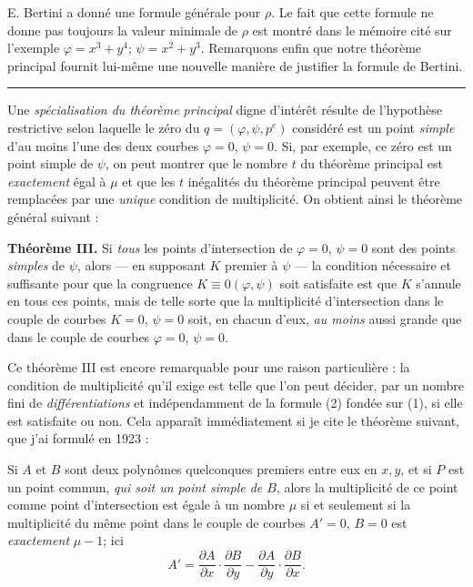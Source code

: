 E. Bertini a donné une formule générale pour $\rho$. Le fait que cette formule ne donne pas toujours la valeur minimale de $\rho$ est montré dans le mémoire cité sur l'exemple $\varphi=x^3+y^4$; $\psi=x^2+y^3$. Remarquons enfin que notre théorème principal fournit lui-même une nouvelle manière de justifier la formule de Bertini.

\begin{center}
\rule{4cm}{0.4pt}
\end{center}

Une \emph{spécialisation du théorème principal} digne d'intérêt résulte de l'hypothèse restrictive selon laquelle le zéro du $q=(\varphi,\psi,p^e)$ considéré est un point \emph{simple} d'au moins l'une des deux courbes $\varphi=0$, $\psi=0$. Si, par exemple, ce zéro est un point simple de $\psi$, on peut montrer que le nombre $t$ du théorème principal est \emph{exactement} égal à $\mu$ et que les $t$ inégalités du théorème principal peuvent être remplacées par une \emph{unique} condition de multiplicité. On obtient ainsi le théorème général suivant :

\textbf{Théorème III.} Si \emph{tous} les points d'intersection de $\varphi=0$, $\psi=0$ sont des points \emph{simples} de $\psi$, alors --- en supposant $K$ premier à $\psi$ --- la condition nécessaire et suffisante pour que la congruence $K\equiv0(\varphi,\psi)$ soit satisfaite est que $K$ s'annule en tous ces points, mais de telle sorte que la multiplicité d'intersection dans le couple de courbes $K=0$, $\psi=0$ soit, en chacun d'eux, \emph{au moins} aussi grande que dans le couple de courbes $\varphi=0$, $\psi=0$.

Ce théorème III est encore remarquable pour une raison particulière : la condition de multiplicité qu'il exige est telle que l'on peut décider, par un nombre fini de \emph{différentiations} et indépendamment de la formule (2) fondée sur (1), si elle est satisfaite ou non. Cela apparaît immédiatement si je cite le \og théorème\fg{} suivant, que j'ai formulé en 1923 :

Si $A$ et $B$ sont deux polynômes quelconques premiers entre eux en $x,y$, et si $P$ est un point commun, \emph{qui soit un point simple de $B$}, alors la multiplicité de ce point comme point d'intersection est égale à un nombre $\mu$ si et seulement si la multiplicité du même point dans le couple de courbes $A'=0$, $B=0$ est \emph{exactement} $\mu-1$; ici
\[
A'=\frac{\partial A}{\partial x}\cdot\frac{\partial B}{\partial y}
   -\frac{\partial A}{\partial y}\cdot\frac{\partial B}{\partial x}.
\]

